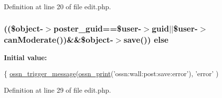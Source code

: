 Definition at line 20 of file edit.\+php.

\subsubsection[{\texorpdfstring{else}{else}}]{ ((\$object-\/$>${\bf poster\+\_\+guid}==\${\bf user}-\/$>$guid$\vert$$\vert$\${\bf user}-\/$>$can\+Moderate())\&\&\$object-\/$>$save()) else}\hypertarget{components_2_ossn_wall_2actions_2wall_2post_2edit_8php_a947707fcbd4a8738af10ded11921378d}{}\label{components_2_ossn_wall_2actions_2wall_2post_2edit_8php_a947707fcbd4a8738af10ded11921378d}
{\bfseries Initial value\+:}
\begin{DoxyCode}
\{
        \hyperlink{ossn_8lib_8system_8php_ab3f23f23f32f50c12e7aea0ffaccaac7}{ossn\_trigger\_message}(\hyperlink{ossn_8lib_8languages_8php_a2be5d1c4b695593a9b9067b96df2150a}{ossn\_print}(\textcolor{stringliteral}{'ossn:wall:post:save:error'}), \textcolor{stringliteral}{'error'}
      )
\end{DoxyCode}


Definition at line 29 of file edit.\+php.

